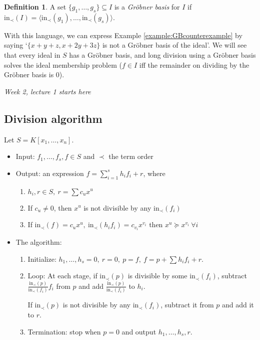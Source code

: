 \documentclass[a4paper]{article}
\newcommand{\la}{\langle}
\newcommand{\ra}{\rangle}
\newcommand{\In}{\text{in}}
\theoremstyle{definition}
\newtheorem{defn}{Definition}[subsection]
\begin{document}
\begin{defn}
A set $\{g_1,\ldots,g_s\}\subseteq I$ is a \textit{Gröbner basis} for $I$ if $\In_\prec (I)=\la \In_\prec (g_1),\ldots,\In_\prec (g_s)\ra$.
\end{defn}
With this language, we can express Example \ref{example:GBcounterexample} by saying `$\{x+y+z,x+2y+3z\}$ is not a Gröbner basis of the ideal'. We will see that every ideal in $S$ has a Gröbner basis, and long division using a Gröbner basis solves the ideal membership problem ($f\in I$ iff the remainder on dividing by the Gröbner basis is 0).

\begin{flushright}
\textit{Week 2, lecture 1 starts here}
\end{flushright}

\subsection{Division algorithm}
Let $S=K[x_1,\ldots,x_n]$.
\begin{itemize}
\item Input: $f_1,\ldots,f_s,f\in S$ and $\prec$ the term order
\item Output: an expression $f=\sum_{i=1}^s h_i f_i+r$, where
\begin{enumerate}
\item $h_i,r\in S,\ r=\sum c_u x^u$
\item If $c_u\neq 0$, then $x^u$ is not divisible by any $\In_\prec (f_i)$
\item If $\In_\prec(f)=c_u x^u,\ \In_\prec(h_i f_i)=c_{v_i}x^{v_i}$ then $x^u\succeq x^{v_i} \ \forall i$
\end{enumerate}
\item The algorithm:\begin{enumerate}
\item Initialize: $h_1,\ldots,h_s=0,\ r=0,\ p=f,\ f=p+\sum h_i f_i+r$.
\item Loop: At each stage, if $\In_\prec(p)$ is divisible by some $\In_\prec(f_i)$, subtract $\frac{\In_\prec(p)}{\In_\prec(f_i)}f_i$ from $p$ and add $\frac{\In_\prec(p)}{\In_\prec(f_i)}$ to $h_i$.

If $\In_\prec(p)$ is not divisible by any $\In_\prec(f_i)$, subtract it from $p$ and add it to $r$.
\item Termination: stop when $p=0$ and output $h_1,\ldots,h_s,r$.
\end{enumerate}
\end{itemize}
\end{document}
